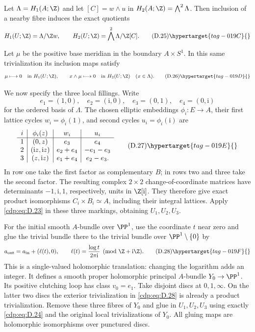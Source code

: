 Let $\Lambda=H_1(A;\Z)$ and let $[C]=w\wedge u$ in
$H_2(A;\Z)=\bigwedge^2\Lambda$. Then inclusion of a nearby
fibre induces the exact quotients
\[
 H_1(U;\Z)=\Lambda/\Z w,\qquad
 H_2(U;\Z)=\bigwedge^2\Lambda/\Z[C].
\tag{D.25}\hypertarget{tag-019C}{}\label{cdp:eq:D.25}
\]


\item Let $\mu$ be the positive base meridian in the boundary
$A\times S^1$. In this same trivialization its inclusion
maps satisfy
\[
 \mu\longmapsto0\quad\hbox{in }H_1(U;\Z),
 \qquad
 x\wedge\mu\longmapsto0\quad\hbox{in }H_2(U;\Z)
 \quad(x\in\Lambda).
\tag{D.26}\hypertarget{tag-019D}{}\label{cdp:eq:D.26}
\]


\item We now specify the three local fillings. Write
\[
 e_1=(1,0),\quad e_2=(\mathrm i,0),\quad
 e_3=(0,1),\quad e_4=(0,\mathrm i)
\]
for the ordered basis of $\Lambda$. The chosen elliptic
embeddings $\phi_i:E\to A$, their first lattice cycles
$w_i=\phi_i(1)$, and second cycles $u_i=\phi_i(\mathrm i)$ are
\[
\begin{array}{c|c|c|c}
 i&\phi_i(z)&w_i&u_i\\ \hline
 1&(0,z)&e_3&e_4\\
 2&(\mathrm i z,\mathrm i z)&e_2+e_4&-e_1-e_3\\
 3&(z,\mathrm i z)&e_1+e_4&e_2-e_3.
\end{array}
\tag{D.27}\hypertarget{tag-019E}{}\label{cdp:eq:D.27}
\]
In row one take the first factor as complementary $B$; in
rows two and three take the second factor. The resulting
complex $2\times2$ change-of-coordinate matrices have
determinants $-1,\mathrm i,1$, respectively, units in
$\Z[\mathrm i]$. They therefore give exact product
isomorphisms $C_i\times B_i\simeq A$, including their
integral lattices. Apply \eqref{cdp:eq:D.23} in these three markings,
obtaining $U_1,U_2,U_3$.



\item For the initial smooth $A$-bundle over $\PP^1$, use the
coordinate $t$ near zero and glue the trivial bundle there
to the trivial bundle over $\PP^1\setminus\{0\}$ by
\[
 a_{\rm out}=a_{\rm in}+(\ell(t),0),
 \qquad \ell(t)=\frac{\log t}{2\pi\mathrm i}\pmod{\Z+\mathrm i\Z}.
\tag{D.28}\hypertarget{tag-019F}{}\label{cdp:eq:D.28}
\]
This is a single-valued holomorphic translation: changing
the logarithm adds an integer. It defines a smooth proper
holomorphic principal $A$-bundle $Y_0\to\PP^1$.
Its positive clutching loop has class $v_0=e_1$.
Take disjoint discs at $0,1,\infty$. On the latter two
discs the exterior trivialization in \eqref{cdp:eq:D.28} is already a
product trivialization. Remove these three fibres of $Y_0$
and glue in $U_1,U_2,U_3$ using exactly \eqref{cdp:eq:D.24} and the
original local trivializations of $Y_0$. All gluing maps
are holomorphic isomorphisms over punctured discs. 

